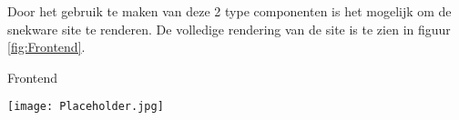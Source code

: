 \whitespace
Door het gebruik te maken van deze 2 type componenten is het mogelijk om de snekware site te renderen.
De volledige rendering van de site is te zien in figuur \ref{fig:Frontend}.

\whitespace
\begin{graphic}
    \captionsetup{type=figure}
    \caption{Frontend}
    \texttt{[image: Placeholder.jpg]}
    \label{fig:Frontend}
\end{graphic}

